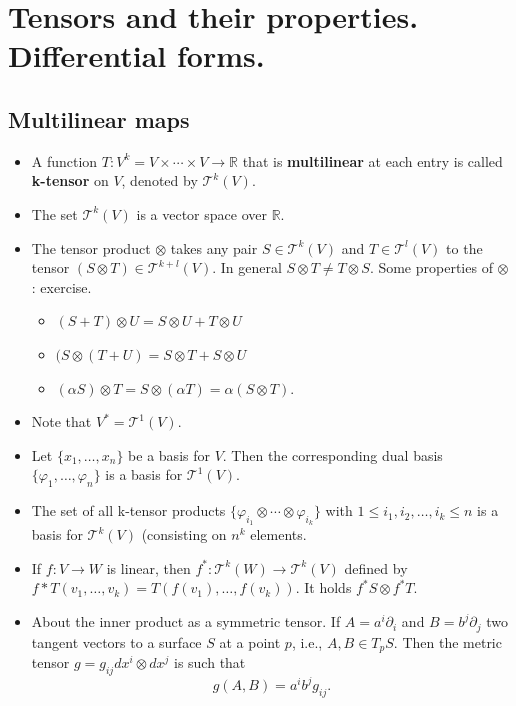 \documentclass{amsart}
\begin{document}
\section{Tensors and their properties. Differential forms.}
\label{sec:orgf28bc58}

\subsection{Multilinear maps}
\label{sec:org5f160e5}
\begin{itemize}
\item A function \(T:V^k = V\times\cdots\times V \to \mathbb{R}\) that is \textbf{multilinear} at each entry is called \textbf{k-tensor} on \(V\), denoted by \(\mathcal{T}^k(V)\).
\item The set \(\mathcal{T}^k(V)\) is a vector space over \(\mathbb{R}\).
\item The tensor product \(\otimes\) takes any pair \(S\in \mathcal{T}^k(V)\) and \(T\in \mathcal{T}^l(V)\) to the tensor \(\left(S \otimes T\right)\in \mathcal{T}^{k+l}(V)\). In general \(S\otimes T \neq T\otimes S\). Some properties of \(\otimes\): exercise.
\begin{itemize}
\item \((S + T) \otimes U  = S \otimes U + T \otimes U\)
\item \((S \otimes ( T + U)  = S \otimes T + S \otimes U\)
\item \((\alpha S) \otimes T = S\otimes (\alpha T) = \alpha (S \otimes T)\).
\end{itemize}
\item Note that \(V^* = \mathcal{T}^1(V)\).
\item Let \(\{ x_1, \ldots, x_n \}\) be a basis for \(V\). Then the corresponding dual basis \(\{ \varphi_1, \ldots, \varphi_n\}\) is a basis for \(\mathcal{T}^1(V)\).
\item The set of all k-tensor products \(\{ \varphi_{i_1} \otimes \cdots \otimes \varphi_{i_k} \}\) with \(1\leq i_1, i_2,\ldots,i_k \leq n\) is a basis for \(\mathcal{T}^k(V)\) (consisting on \(n^k\) elements.
\item If \(f:V\to W\) is linear, then \(f^*: \mathcal{T}^k(W) \to \mathcal{T}^k(V)\) defined by \(f*T(v_1, \ldots, v_k) = T(f(v_1),\ldots,f(v_k))\). It holds \(f^*S \otimes f^*T\).
\item About the inner product as a symmetric tensor. If \(A = a^i\partial_i\) and \(B= b^j\partial_j\) two tangent vectors to a surface \(S\) at a point \(p\), i.e., \(A,B\in T_pS\). Then the metric tensor \(g = g_{ij}dx^i\otimes dx^j\) is such that \[ g(A,B) = a^ib^jg_{ij} .\]

\end{itemize}
\end{document}
